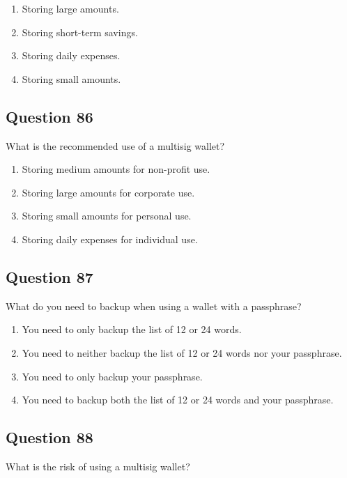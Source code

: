 \documentclass[12pt,a4paper]{article}
\begin{document}
\begin{enumerate}[label=\Alph*., leftmargin=*]
\item Storing large amounts.
\item Storing short-term savings.
\item Storing daily expenses.
\item Storing small amounts.
\end{enumerate}

\bigskip


\subsection*{Question 86}
What is the recommended use of a multisig wallet?

\begin{enumerate}[label=\Alph*., leftmargin=*]
\item Storing medium amounts for non-profit use.
\item Storing large amounts for corporate use.
\item Storing small amounts for personal use.
\item Storing daily expenses for individual use.
\end{enumerate}

\bigskip


\subsection*{Question 87}
What do you need to backup when using a wallet with a passphrase?

\begin{enumerate}[label=\Alph*., leftmargin=*]
\item You need to only backup the list of 12 or 24 words.
\item You need to neither backup the list of 12 or 24 words nor your passphrase.
\item You need to only backup your passphrase.
\item You need to backup both the list of 12 or 24 words and your passphrase.
\end{enumerate}

\bigskip


\subsection*{Question 88}
What is the risk of using a multisig wallet?
\end{document}
